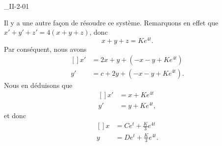 \begin{corrige}{_II-2-01}
\begin{enumerate}
\begin{alternative}
	Il y a une autre façon de résoudre ce système. Remarquons en effet que $x'+y'+z'=4(x+y+z)$, donc
\begin{equation}
	x+y+z=K e^{4t}.
\end{equation}
Par conséquent, nous avons
\begin{equation}
	\begin{aligned}[]
		x'	&=2x+y+(-x-y+K e^{4t})\\
		y'	&=c+2y+(-x-y+K e^{4t}).
	\end{aligned}
\end{equation}
Nous en déduisons que
\begin{equation}
	\begin{aligned}[]
		x'	&=x+K e^{4t}\\
		y'	&=y+K e^{4t},
	\end{aligned}
\end{equation}
et donc
\begin{equation}
	\begin{aligned}[]
		x	&=Ce^t+\frac{ K }{ 3 } e^{4t}\\
		y	&=De^t+\frac{ K }{ 3 } e^{4t}.
	\end{aligned}
\end{equation}

\end{alternative}


\end{enumerate}
\end{corrige}
